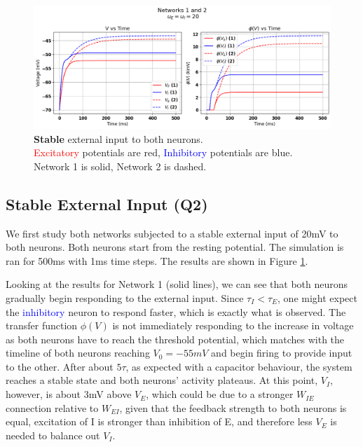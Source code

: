 \documentclass[10pt,twocolumn]{article}
\begin{document}
\begin{figure}
    \centering
    \captionsetup{justification=centering}
    \includegraphics[width=1\textwidth]{images/12-stable.png}
    \caption{
        \textbf{Stable} external input to both neurons.\\
        \textcolor{red}{Excitatory} potentials are red, \textcolor{blue}{Inhibitory} potentials are blue. \\
        Network 1 is solid, Network 2 is dashed.
    }
    \label{fig:stable-input}
\end{figure}

\subsection{Stable External Input (Q2)}
We first study both networks subjected to a stable external input of 20mV to
both neurons.
Both neurons start from the resting potential. The simulation is ran for 500ms
with 1ms time steps. The results are shown in Figure \ref{fig:stable-input}.

Looking at the results for Network 1 (solid lines), we can see that both neurons
gradually begin responding to the external input. Since $\tau_I < \tau_E$,
one might expect the \textcolor{blue}{inhibitory} neuron to respond faster, which is
exactly what is observed. The transfer function $\phi(V)$ is not immediately
responding to the increase in voltage as both neurons have to reach the threshold
potential, which matches with the timeline of both neurons reaching $V_0=-55mV$
and begin firing to provide input to the other. After about $5\tau$, as
expected with a capacitor behaviour, the system reaches a stable state
and both neurons' activity plateaus. At this point, $V_I$, however,
is about 3mV above $V_E$, which could be due to a stronger $W_{IE}$ connection
relative to $W_{EI}$, given that the feedback strength to both neurons is equal,
excitation of I is stronger than inhibition of E, and therefore less $V_E$
is needed to balance out $V_I$.
\end{document}
